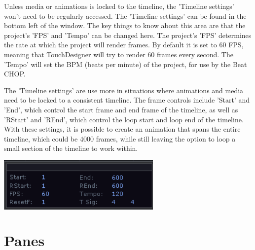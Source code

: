 \begin{fullwidth}

Unless media or animations is locked to the timeline, the 'Timeline settings' won't need to be regularly accessed. The 'Timeline settings' can be found in the bottom left of the window. The key things to know about this area are that the project's 'FPS' and 'Tempo' can be changed here. The project's 'FPS' determines the rate at which the project will render frames. By default it is set to 60 FPS, meaning that TouchDesigner will try to render 60 frames every second. The 'Tempo' will set the BPM (beats per minute) of the project, for use by the Beat CHOP. 

The 'Timeline settings' are use more in situations where animations and media need to be locked to a consistent timeline. The frame controls include 'Start' and 'End', which control the start frame and end frame of the timeline, as well as 'RStart' and 'REnd', which control the loop start and loop end of the timeline. With these settings, it is possible to create an animation that spans the entire timeline, which could be 4000 frames, while still leaving the option to loop a small section of the timeline to work within. 

\begin{center}
\includegraphics[width=8cm]{./img/2.4/timeline.png}
\end{center}

\end{fullwidth}
\section{Panes}

